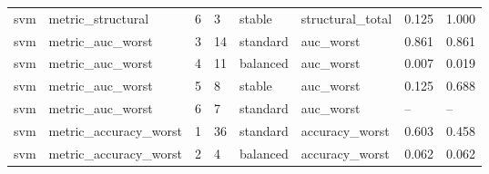 \begin{table}
\begin{tabular}{llllllll}
svm & metric\_structural & 6 & 3 & stable & structural\_total & 0.125 & 1.000 \\
svm & metric\_auc\_worst & 3 & 14 & standard & auc\_worst & 0.861 & 0.861 \\
svm & metric\_auc\_worst & 4 & 11 & balanced & auc\_worst & 0.007 & 0.019 \\
svm & metric\_auc\_worst & 5 & 8 & stable & auc\_worst & 0.125 & 0.688 \\
svm & metric\_auc\_worst & 6 & 7 & standard & auc\_worst & -- & -- \\
svm & metric\_accuracy\_worst & 1 & 36 & standard & accuracy\_worst & 0.603 & 0.458 \\
svm & metric\_accuracy\_worst & 2 & 4 & balanced & accuracy\_worst & 0.062 & 0.062 \\
\bottomrule
\end{tabular}
\end{table}
